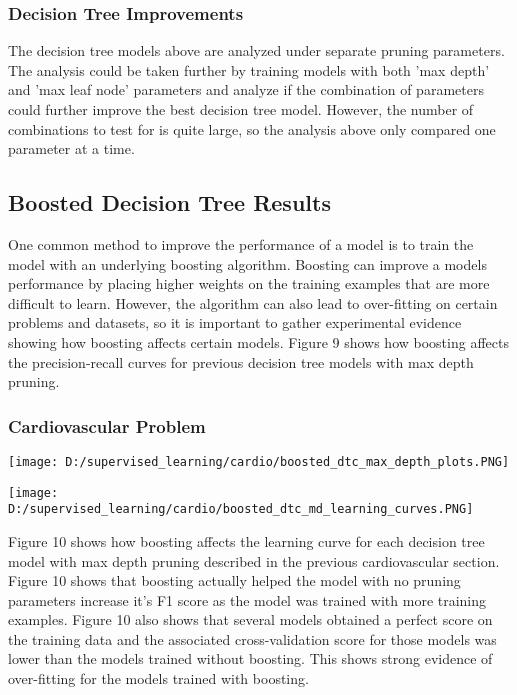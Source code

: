 \documentclass[10pt,journal,compsoc]{IEEEtran}
\begin{document}
\subsubsection{Decision Tree Improvements}
The decision tree models above are analyzed under separate pruning parameters. The analysis could be taken further by training models with both 'max depth' and 'max leaf node' parameters and analyze if the combination of parameters could further improve the best decision tree model. However, the number of combinations to test for is quite large, so the analysis above only compared one parameter at a time. 
\subsection{Boosted Decision Tree Results}
One common method to improve the performance of a model is to train the model with an underlying boosting algorithm. Boosting can improve a models performance by placing higher weights on the training examples that are more difficult to learn. However, the algorithm can also lead to over-fitting on certain problems and datasets, so it is important to gather experimental evidence showing how boosting affects certain models. Figure 9 shows how boosting affects the precision-recall curves for previous decision tree models with max depth pruning.
\subsubsection{Cardiovascular Problem}
\begin{center}
	\texttt{[image: D:/supervised\_learning/cardio/boosted\_dtc\_max\_depth\_plots.PNG]}
\end{center}
\begin{center}
	\texttt{[image: D:/supervised\_learning/cardio/boosted\_dtc\_md\_learning\_curves.PNG]}
\end{center}

Figure 10 shows how boosting affects the learning curve for each decision tree model with max depth pruning described in the previous cardiovascular section. Figure 10 shows that boosting actually helped the model with no pruning parameters increase it's F1 score as the model was trained with more training examples. Figure 10 also shows that several models obtained a perfect score on the training data and the associated cross-validation score for those models was lower than the models trained without boosting. This shows strong evidence of over-fitting for the models trained with boosting.
\end{document}
